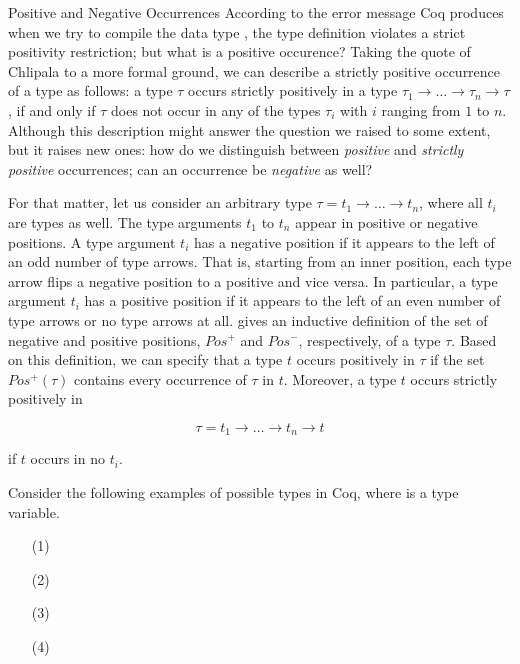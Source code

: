 \begin{excursus}{Positive and Negative Occurrences}
According to the error message Coq produces when we try to compile the data type , the type definition violates a strict positivity restriction; but what is a positive occurence?
Taking the quote of Chlipala to a more formal ground, we can describe a strictly positive occurrence of a type as follows: a type $\tau$ occurs strictly positively in a type $\tau_1\rightarrow \dots \rightarrow \tau_n \rightarrow \tau$, if and only if $\tau$ does not occur in any of the types $\tau_i$ with $i$ ranging from $1$ to $n$.
Although this description might answer the question we raised to some extent, but it raises new ones: how do we distinguish between \emph{positive} and \emph{strictly positive} occurrences; can an occurrence be \emph{negative} as well?

For that matter, let us consider an arbitrary type $\tau = t_1 \rightarrow \dots \rightarrow t_n$, where all $t_i$ are types as well.
The type arguments $t_1$ to $t_n$ appear in positive or negative positions.
A type argument $t_i$ has a negative position if it appears to the left of an odd number of type arrows.
That is, starting from an inner position, each type arrow flips a negative position to a positive and vice versa.
In particular, a type argument $t_i$ has a positive position if it appears to the left of an even number of type arrows or no type arrows at all.
\citet{blanqui2002inductivedatatype} gives an inductive definition of the set of negative and positive positions, $Pos^{+}$ and $Pos^{-}$, respectively, of a type $\tau$.
Based on this definition, we can specify that a type $t$ occurs positively in $\tau$ if the set $Pos^{+} (\tau)$ contains every occurrence of $\tau$ in $t$.
Moreover, a type $t$ occurs strictly positively in

\[
\tau = t_1 \rightarrow \dots \rightarrow t_n \rightarrow t
\]

if $t$ occurs in no $t_i$.

Consider the following examples of possible types in Coq, where  is a type variable.

\begin{enumerate}
\item[(1)] 
\item[(2)] 
\item[(3)] 
\item[(4)] 
\end{enumerate}


\end{excursus}
